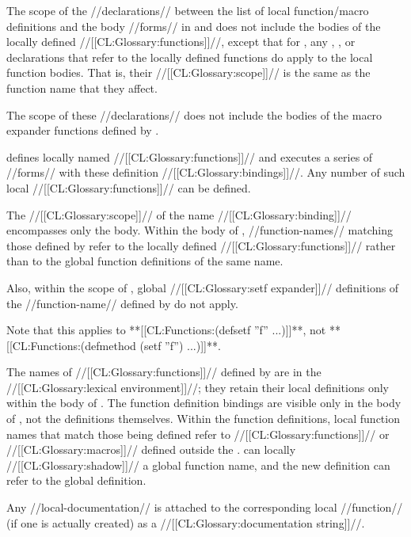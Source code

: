 The scope of the //declarations// between the list of local function/macro definitions and the body //forms// in  and  does not include the bodies of the locally defined //[[CL:Glossary:functions]]//, except that for , any , , or  declarations that refer to the locally defined functions do apply to the local function bodies. That is, their //[[CL:Glossary:scope]]// is the same as the function name that they affect.

The scope of these //declarations// does not include the bodies of the macro expander functions defined by .

\beginlist {}

 defines locally named //[[CL:Glossary:functions]]// and executes a series of //forms// with these definition //[[CL:Glossary:bindings]]//. Any number of such local //[[CL:Glossary:functions]]// can be defined.

The //[[CL:Glossary:scope]]// of the name //[[CL:Glossary:binding]]// encompasses only the body. Within the body of , //function-names// matching those defined by  refer to the locally defined //[[CL:Glossary:functions]]// rather than to the global function definitions of the same name.

Also, within the scope of , global //[[CL:Glossary:setf expander]]// definitions of the //function-name// defined by  do not apply.

Note that this applies to **[[CL:Functions:(defsetf ''f'' ...)]]**, not **[[CL:Functions:(defmethod (setf ''f'') ...)]]**.

The names of //[[CL:Glossary:functions]]// defined by  are in the //[[CL:Glossary:lexical environment]]//; they retain their local definitions only within the body of . The function definition bindings are visible only in the body of , not the definitions themselves. Within the function definitions, local function names that match those being defined refer to //[[CL:Glossary:functions]]// or //[[CL:Glossary:macros]]// defined outside the .  can locally //[[CL:Glossary:shadow]]// a global function name, and the new definition can refer to the global definition.

Any //local-documentation// is attached to the corresponding local //function// (if one is actually created) as a //[[CL:Glossary:documentation string]]//.

